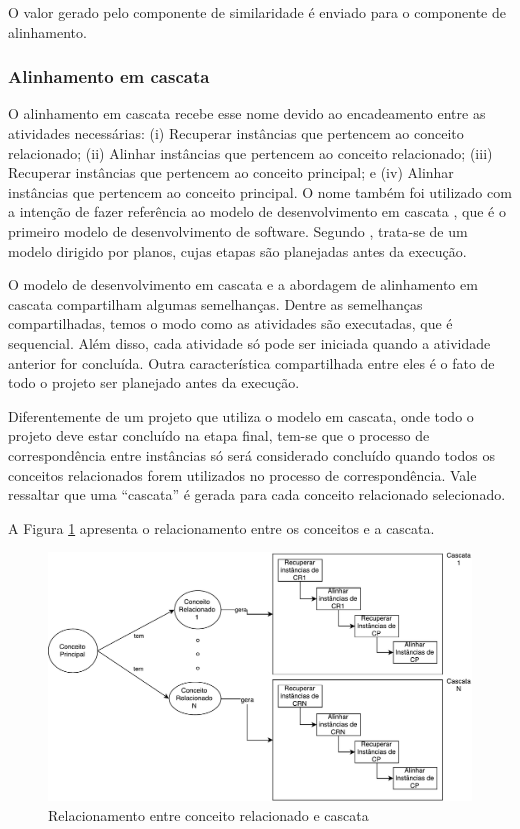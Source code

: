 O valor gerado pelo componente de similaridade é enviado para o componente de alinhamento.

\subsubsection{Alinhamento em cascata}
\label{sub:cascata}
O alinhamento em cascata recebe esse nome devido ao encadeamento entre as atividades necessárias: (i) Recuperar instâncias que pertencem ao conceito relacionado; (ii) Alinhar instâncias que pertencem ao conceito relacionado; (iii) Recuperar instâncias que pertencem ao conceito principal; e (iv) Alinhar instâncias que pertencem ao conceito principal. O nome também foi utilizado com a intenção de fazer referência ao modelo de desenvolvimento em cascata \cite{royce1970managing}, que é o primeiro modelo de desenvolvimento de software. Segundo , trata-se de um modelo dirigido por planos, cujas etapas são planejadas antes da execução. 

O modelo de desenvolvimento em cascata e a abordagem de alinhamento em cascata compartilham algumas semelhanças. Dentre as semelhanças compartilhadas, temos o modo como as atividades são executadas, que é sequencial. Além disso, cada atividade só pode ser iniciada quando a atividade anterior for concluída. Outra característica compartilhada entre eles é o fato de todo o projeto ser planejado antes da execução. 

Diferentemente de um projeto que utiliza o modelo em cascata, onde todo o projeto deve estar concluído na etapa final, tem-se que o processo de correspondência entre instâncias só será considerado concluído quando todos os conceitos relacionados forem utilizados no processo de correspondência. Vale ressaltar que uma “cascata” é gerada para cada conceito relacionado selecionado. 

A Figura \ref{cp_cascata} apresenta o relacionamento entre os conceitos e a cascata.

\begin{figure}[!h]
	\centering
	\includegraphics[width=1\textwidth]{./imagens/CM_cascata.pdf}
	\caption{Relacionamento entre conceito relacionado e cascata}
	\label{cp_cascata}
\end{figure}

